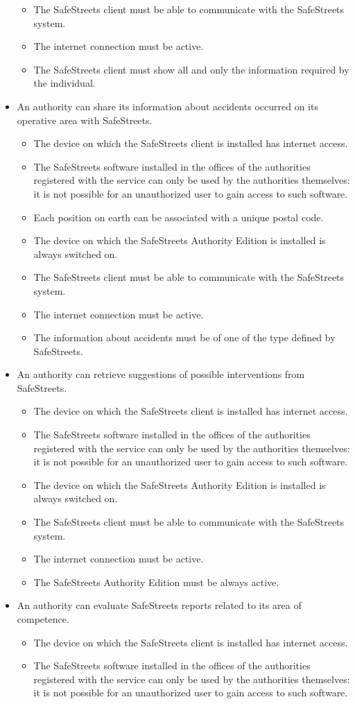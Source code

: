 \documentclass{article}
\newcommand\goal[1]{\item[{[G#1]}] }
\newcommand\requirement[1]{\item[{[R#1]}] }
\newcommand\assumption[1]{\item[{[A#1]}] }
\begin{document}
\begin{itemize}
\begin{itemize}
					\requirement{1} The SafeStreets client must be able to communicate with the SafeStreets system.
					\requirement{2} The internet connection must be active.
					\requirement{3} The SafeStreets client must show all and only the information required by the individual.
				\end{itemize}					
				\goal{3}An authority can share its information about accidents occurred on its operative area with SafeStreets.
				\begin{itemize}
					\assumption{1} The device on which the SafeStreets client is installed has internet access.
					\assumption{7} The SafeStreets software installed in the offices of the authorities registered with the service can only be used by the authorities 				themselves: it is not possible for an unauthorized user to gain access to such software.
					\assumption{8} Each position on earth can be associated with a unique postal code.
					\assumption{10} The device on which the SafeStreets Authority Edition is installed is always switched on.
				   \requirement{1} The SafeStreets client must be able to communicate with the SafeStreets system.
				   \requirement{2} The internet connection must be active.
				   \requirement{3} The information about accidents must be of one of the type defined by SafeStreets.
				\end{itemize}
				\goal{4}An authority can retrieve suggestions of possible interventions from SafeStreets.
				\begin{itemize}
					\assumption{1} The device on which the SafeStreets client is installed has internet access.
					\assumption{7} The SafeStreets software installed in the offices of the authorities registered with the service can only be used by the authorities 			themselves: it is not possible for an unauthorized user to gain access to such software.
					\assumption{10} The device on which the SafeStreets Authority Edition is installed is always switched on.
					\requirement{1} The SafeStreets client must be able to communicate with the SafeStreets system.
					\requirement{2} The internet connection must be active.
					\requirement{3} The SafeStreets Authority Edition must be always active.
				\end{itemize}
				\goal{5}An authority can evaluate SafeStreets reports related to its area of competence.
				\begin{itemize}
					\assumption{1} The device on which the SafeStreets client is installed has internet access.
					\assumption{7} The SafeStreets software installed in the offices of the authorities registered with the service can only be used by the authorities 			themselves: it is not possible for an unauthorized user to gain access to such software.

\end{itemize}
\end{itemize}
\end{document}
